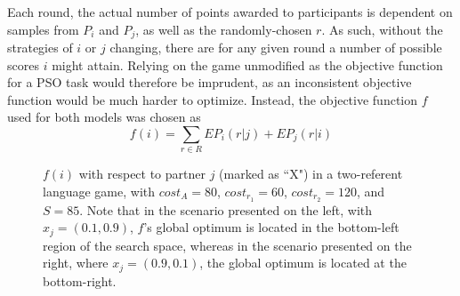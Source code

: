 \documentclass[12pt,a4paper]{article}
\begin{document}
Each round, the actual number of points awarded to participants is dependent on samples from $P_i$ and $P_j$, as well as the randomly-chosen $r$. As such, without the strategies of $i$ or $j$ changing, there are for any given round a number of possible scores $i$ might attain. Relying on the game unmodified as the objective function for a PSO task would therefore be imprudent, as an inconsistent objective function would be much harder to optimize. Instead, the objective function $f$ used for both models was chosen as 
\begin{equation}
f(i) = \sum_{r \in R} EP_{i}(r|j) + EP_{j}(r|i)
\end{equation}

\begin{figure}
\centering
\scalebox{.725}{}
\caption{$f(i)$ with respect to partner $j$ (marked as ``X") in a two-referent language game, with $cost_A=80$, $cost_{r_1}=60$, $cost_{r_2}=120$, and $S=85$. Note that in the scenario presented on the left, with $x_j = (0.1, 0.9)$, $f$'s global optimum is located in the bottom-left region of the search space, whereas in the scenario presented on the right, where $x_j = (0.9, 0.1)$, the global optimum is located at the bottom-right.}
\label{fig:1}
\end{figure}
\end{document}
